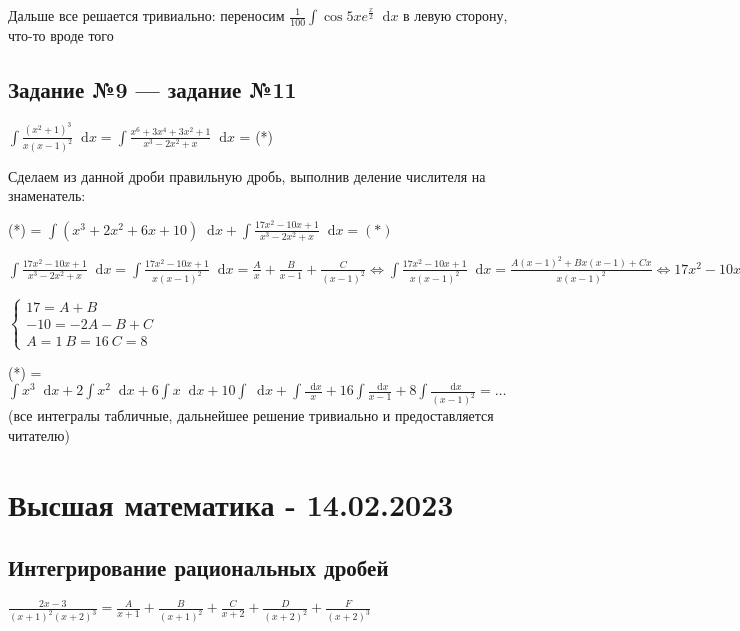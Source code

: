 \documentclass{article}
\newcommand*\diff{\mathop{}\!\mathrm{d}}
\begin{document}
\hfill

Дальше все решается тривиально: переносим $\frac{1}{100} \int \cos 5 x e^{\frac{x}{2}} \diff x$ в левую сторону, что-то вроде того

\subsection{Задание №9 — задание №11}

$\int \frac{(x^2 + 1)^3}{x(x - 1)^2} \diff x = \int \frac{x^6 + 3x^4 + 3x^2 + 1}{x^3 - 2 x^2 + x} \diff x$ = (*)

\hfill

Сделаем из данной дроби правильную дробь, выполнив деление числителя на знаменатель:

(*) = $\int (x^3 + 2x^2 + 6x + 10) \diff x + \int \frac{17x^2 - 10 x + 1}{x^3 - 2x^2 + x} \diff x = (*)$

\hfill

$\int \frac{17x^2 - 10 x + 1}{x^3 - 2x^2 + x} \diff x = \int \frac{17x^2 - 10 x + 1}{x(x - 1)^2} \diff x = \frac{A}{x} + \frac{B}{x - 1} + \frac{C}{(x - 1)^2} \Longleftrightarrow \int \frac{17x^2 - 10 x + 1}{x(x - 1)^2} \diff x = \frac{A(x-1)^2 + Bx(x-1) + Cx}{x(x-1)^2} \Longleftrightarrow 17x^2 - 10x + 1 = Ax^2 - 2A x + A + B x^2 - B x + C x$

$\begin{cases}
    17 = A + B \\
    -10 = -2A - B + C \\
    A = 1 \ B = 16 \ C = 8
\end{cases}$

\hfill

\hfill

(*) = $\int x^3 \diff x + 2 \int x^2 \diff x + 6 \int x \diff x + 10 \int \diff x + \int \frac{\diff x}{x} + 16 \int \frac{\diff x}{x - 1} + 8 \int \frac{\diff x}{(x - 1)^2} = \dots$ (все интегралы табличные, дальнейшее решение тривиально и предоставляется читателю)

\pagebreak
\section{Высшая математика - 14.02.2023}

\subsection{Интегрирование рациональных дробей}

$
\frac{2x - 3}{(x+1)^2 (x+2)^3} = \frac{A}{x + 1} + \frac{B}{(x + 1)^2} + \frac{C}{x + 2} + \frac{D}{(x + 2)^2} + \frac{F}{(x + 2)^3}
$
\end{document}
